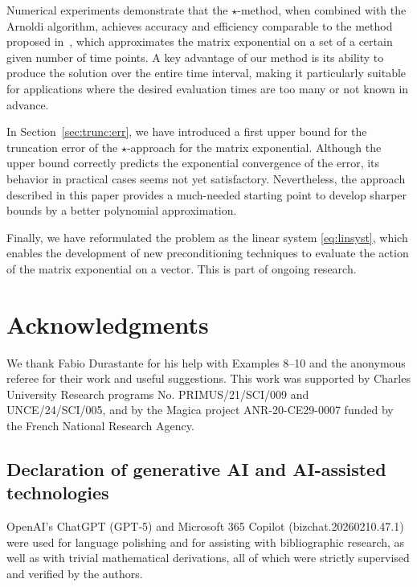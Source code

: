 \documentclass[final,1p,times,number]{elsarticle}
\theoremstyle{plain}%
\begin{document}
Numerical experiments demonstrate that the $\star$-method, when combined with the Arnoldi algorithm, achieves accuracy and efficiency comparable to the method proposed in~\cite{al2011computing}, which approximates the matrix exponential on a set of a certain given number of time points. A key advantage of our method is its ability to produce the solution over the entire time interval, making it particularly suitable for applications where the desired evaluation times are too many or not known in advance.

 In Section~\ref{sec:trunc:err}, we have introduced a first upper bound for the truncation error of the $\star$-approach for the matrix exponential. Although the upper bound correctly predicts the exponential convergence of the error, its behavior in practical cases seems not yet satisfactory. Nevertheless, the approach described in this paper provides a much-needed starting point to develop sharper bounds by a better polynomial approximation.

Finally, we have reformulated the problem as the linear system \eqref{eq:linsyst}, which enables the development of new preconditioning techniques to evaluate the action of the matrix exponential on a vector. This is part of ongoing research.

\section*{Acknowledgments}
  We thank Fabio Durastante for his help with Examples 8--10 and the anonymous referee for their work and useful suggestions.
  This work was supported by Charles University Research programs No. PRIMUS/21/SCI/009 and UNCE/24/SCI/005, and by the Magica project ANR-20-CE29-0007 funded by the French National Research Agency. 

  \subsection*{Declaration of generative AI and AI-assisted technologies}
  \noindent   OpenAI’s ChatGPT (GPT‑5) and Microsoft 365 Copilot (bizchat.20260210.47.1) were used for language polishing and for assisting with bibliographic research, as well as with trivial mathematical derivations, all of which were strictly supervised and verified by the authors.


\end{document}
